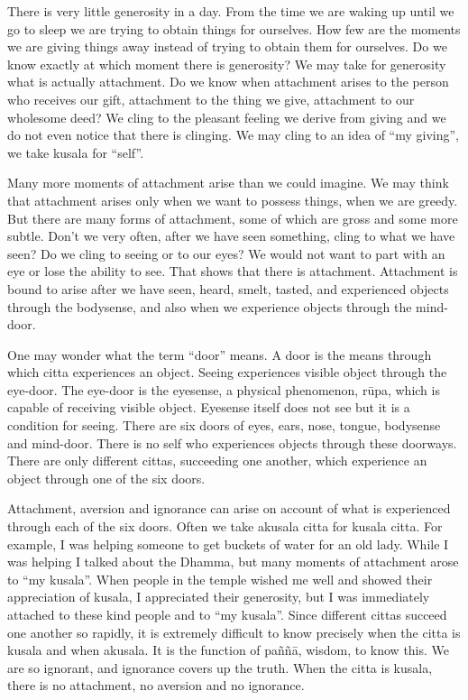 There is very little generosity in a day. From the time we are waking up
until we go to sleep we are trying to obtain things for ourselves. How
few are the moments we are giving things away instead of trying to
obtain them for ourselves. Do we know exactly at which moment there is
generosity? We may take for generosity what is actually attachment. Do
we know when attachment arises to the person who receives our gift,
attachment to the thing we give, attachment to our wholesome deed? We
cling to the pleasant feeling we derive from giving and we do not even
notice that there is clinging. We may cling to an idea of ``my giving'',
we take kusala for ``self''.

Many more moments of attachment arise than we could imagine. We may
think that attachment arises only when we want to possess things, when
we are greedy. But there are many forms of attachment, some of which are
gross and some more subtle. Don't we very often, after we have seen
something, cling to what we have seen? Do we cling to seeing or to our
eyes? We would not want to part with an eye or lose the ability to see.
That shows that there is attachment. Attachment is bound to arise after
we have seen, heard, smelt, tasted, and experienced objects through the
bodysense, and also when we experience objects through the mind-door.

One may wonder what the term ``door'' means. A door is the means through
which citta experiences an object. Seeing experiences visible object
through the eye-door. The eye-door is the eyesense, a physical
phenomenon, rūpa, which is capable of receiving visible object. Eyesense
itself does not see but it is a condition for seeing. There are six
doors of eyes, ears, nose, tongue, bodysense and mind-door. There is no
self who experiences objects through these doorways. There are only
different cittas, succeeding one another, which experience an object
through one of the six doors.

Attachment, aversion and ignorance can arise on account of what is
experienced through each of the six doors. Often we take akusala citta
for kusala citta. For example, I was helping someone to get buckets of
water for an old lady. While I was helping I talked about the Dhamma,
but many moments of attachment arose to ``my kusala''. When people in
the temple wished me well and showed their appreciation of kusala, I
appreciated their generosity, but I was immediately attached to these
kind people and to ``my kusala''. Since different cittas succeed one
another so rapidly, it is extremely difficult to know precisely when the
citta is kusala and when akusala. It is the function of paññā, wisdom,
to know this. We are so ignorant, and ignorance covers up the truth.
When the citta is kusala, there is no attachment, no aversion and no
ignorance.

